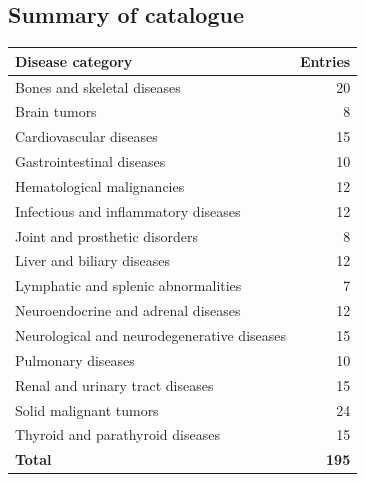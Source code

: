 \subsection{Summary of catalogue}
\begin{center}
\begin{tabular}{@{}p{}r@{}}
\toprule
\textbf{Disease category} & \textbf{Entries} \\
\midrule
Bones and skeletal diseases & 20 \\
Brain tumors & 8 \\
Cardiovascular diseases & 15 \\
Gastrointestinal diseases & 10 \\
Hematological malignancies & 12 \\
Infectious and inflammatory diseases & 12 \\
Joint and prosthetic disorders & 8 \\
Liver and biliary diseases & 12 \\
Lymphatic and splenic abnormalities & 7 \\
Neuroendocrine and adrenal diseases & 12 \\
Neurological and neurodegenerative diseases & 15 \\
Pulmonary diseases & 10 \\
Renal and urinary tract diseases & 15 \\
Solid malignant tumors & 24 \\
Thyroid and parathyroid diseases & 15 \\
\midrule
\textbf{Total} & \textbf{195} \\
\bottomrule
\end{tabular}
\end{center}


